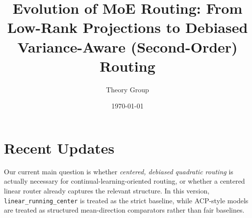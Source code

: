 \documentclass[11pt]{article}
\title{Evolution of MoE Routing: From Low-Rank Projections to Debiased Variance-Aware (Second-Order) Routing}
\author{Theory Group}
\date{\today}
\newcommand{\idea}[1]{\textcolor{red}{[#1]}}
\begin{document}
\maketitle

% 

\section{Recent Updates}


Our current main question is whether \emph{centered, debiased quadratic routing} is actually necessary for continual-learning-oriented routing, or whether a centered linear router already captures the relevant structure. In this version, \texttt{linear\_running\_center} is treated as the strict baseline, while ACP-style models are treated as structured mean-direction comparators rather than fair baselines.
\end{document}
